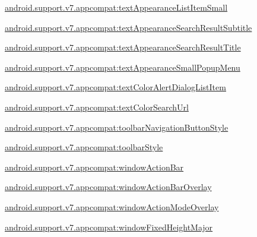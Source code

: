 {\ttfamily \hyperlink{classandroid_1_1support_1_1v7_1_1appcompat_1_1R_1_1styleable_a29f596f618045a5601a94a5dcc66946d}{android.\+support.\+v7.\+appcompat\+:text\+Appearance\+List\+Item\+Small}}

{\ttfamily \hyperlink{classandroid_1_1support_1_1v7_1_1appcompat_1_1R_1_1styleable_a797b49953c62db18a1dff0a607fc45b1}{android.\+support.\+v7.\+appcompat\+:text\+Appearance\+Search\+Result\+Subtitle}}

{\ttfamily \hyperlink{classandroid_1_1support_1_1v7_1_1appcompat_1_1R_1_1styleable_a9d65706b447bcd2a979584ec58b642f9}{android.\+support.\+v7.\+appcompat\+:text\+Appearance\+Search\+Result\+Title}}

{\ttfamily \hyperlink{classandroid_1_1support_1_1v7_1_1appcompat_1_1R_1_1styleable_a3954e911add56535f0dee6d29c451821}{android.\+support.\+v7.\+appcompat\+:text\+Appearance\+Small\+Popup\+Menu}}

{\ttfamily \hyperlink{classandroid_1_1support_1_1v7_1_1appcompat_1_1R_1_1styleable_a3c4e949776f711a5bd06b91184ceb404}{android.\+support.\+v7.\+appcompat\+:text\+Color\+Alert\+Dialog\+List\+Item}}

{\ttfamily \hyperlink{classandroid_1_1support_1_1v7_1_1appcompat_1_1R_1_1styleable_a2b9490f156d0cba539dc09a7aa3883e5}{android.\+support.\+v7.\+appcompat\+:text\+Color\+Search\+Url}}

{\ttfamily \hyperlink{classandroid_1_1support_1_1v7_1_1appcompat_1_1R_1_1styleable_ad578ce7888cd20c22c0f76c70ac3e899}{android.\+support.\+v7.\+appcompat\+:toolbar\+Navigation\+Button\+Style}}

{\ttfamily \hyperlink{classandroid_1_1support_1_1v7_1_1appcompat_1_1R_1_1styleable_a1e7ba103613221a76d37b259fde162e4}{android.\+support.\+v7.\+appcompat\+:toolbar\+Style}}

{\ttfamily \hyperlink{classandroid_1_1support_1_1v7_1_1appcompat_1_1R_1_1styleable_a9ed69fb61097add24dccaf9f82bbd746}{android.\+support.\+v7.\+appcompat\+:window\+Action\+Bar}}

{\ttfamily \hyperlink{classandroid_1_1support_1_1v7_1_1appcompat_1_1R_1_1styleable_aabf99bfa0bdf029240c1024f81c0475d}{android.\+support.\+v7.\+appcompat\+:window\+Action\+Bar\+Overlay}}

{\ttfamily \hyperlink{classandroid_1_1support_1_1v7_1_1appcompat_1_1R_1_1styleable_a68fc3502f128d8ccc5f6cb4fe4662317}{android.\+support.\+v7.\+appcompat\+:window\+Action\+Mode\+Overlay}}

{\ttfamily \hyperlink{classandroid_1_1support_1_1v7_1_1appcompat_1_1R_1_1styleable_ad39d6f1f8f5f5276ffcd26e8ba52a62a}{android.\+support.\+v7.\+appcompat\+:window\+Fixed\+Height\+Major}}

